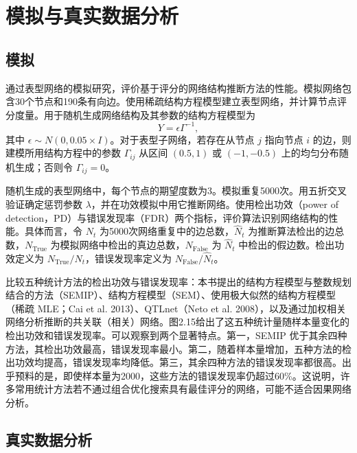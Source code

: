 \section{模拟与真实数据分析}
\subsection{模拟}

通过表型网络的模拟研究，评价基于评分的网络结构推断方法的性能。模拟网络包含30个节点和190条有向边。使用稀疏结构方程模型建立表型网络，并计算节点评分度量。用于随机生成网络结构及其参数的结构方程模型为
\begin{equation}
Y=\epsilon\Gamma^{-1},\tag{2.166}
\end{equation}
其中 $\epsilon\sim N(0,0.05\times I)$。对于表型子网络，若存在从节点 $j$ 指向节点 $i$ 的边，则建模所用结构方程中的参数 $\Gamma_{ij}$ 从区间 $(0.5,1)$ 或 $(-1,-0.5)$ 上的均匀分布随机生成；否则令 $\Gamma_{ij}=0$。

随机生成的表型网络中，每个节点的期望度数为3。模拟重复5000次。用五折交叉验证确定惩罚参数 $\lambda$，并在功效模拟中用它推断网络。使用检出功效（power of detection，PD）与错误发现率（FDR）两个指标，评价算法识别网络结构的性能。具体而言，令 $N_t$ 为5000次网络重复中的边总数，$\widehat N_t$ 为推断算法检出的边总数，$N_{\mathrm{True}}$ 为模拟网络中检出的真边总数，$N_{\mathrm{False}}$ 为 $\widehat N_t$ 中检出的假边数。检出功效定义为 $N_{\mathrm{True}}/N_t$，错误发现率定义为 $N_{\mathrm{False}}/\widehat N_t$。

比较五种统计方法的检出功效与错误发现率：本书提出的结构方程模型与整数规划结合的方法（SEMIP）、结构方程模型（SEM）、使用极大似然的结构方程模型（稀疏 MLE；Cai et al. 2013）、QTLnet（Neto et al. 2008），以及通过加权相关网络分析推断的共关联（相关）网络。图2.15给出了这五种统计量随样本量变化的检出功效和错误发现率。可以观察到两个显著特点。第一，SEMIP 优于其余四种方法，其检出功效最高，错误发现率最小。第二，随着样本量增加，五种方法的检出功效均提高，错误发现率均降低。第三，其余四种方法的错误发现率都很高。出乎预料的是，即使样本量为2000，这些方法的错误发现率仍超过60\%。这说明，许多常用统计方法若不通过组合优化搜索具有最佳评分的网络，可能不适合因果网络分析。

\begin{figure}[htbp]
\centering

\end{figure}

\subsection{真实数据分析}


